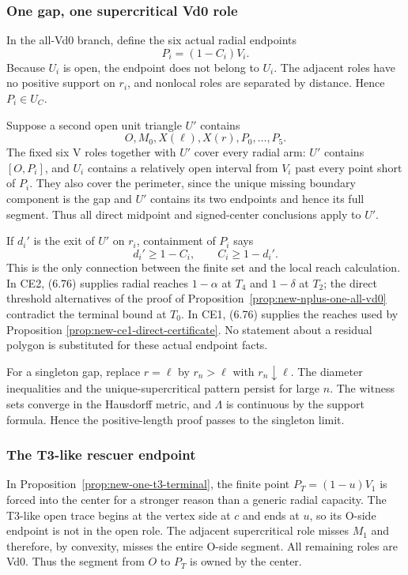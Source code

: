 \subsubsection{One gap, one supercritical Vd0 role}

In the all-Vd0 branch, define the six actual radial endpoints
\[
 P_i=(1-C_i)V_i.
\]
Because $U_i$ is open, the endpoint does not belong to $U_i$.  The adjacent
roles have no positive support on $r_i$, and nonlocal roles are separated by
distance.  Hence $P_i\in U_C$.

Suppose a second open unit triangle $U'$ contains
\[
 O,M_0,X(\ell),X(r),P_0,\ldots,P_5.
\]
The fixed six V roles together with $U'$ cover every radial arm: $U'$ contains
$[O,P_i]$, and $U_i$ contains a relatively open interval from $V_i$ past every
point short of $P_i$.  They also cover the perimeter, since the unique missing
boundary component is the gap and $U'$ contains its two endpoints and hence
its full segment.  Thus all direct midpoint and signed-center conclusions
apply to $U'$.

If $d_i'$ is the exit of $U'$ on $r_i$, containment of $P_i$ says
\[
 d_i'\ge1-C_i,
 \qquad
 C_i\ge1-d_i'.
 \tag{6.76}
\]
This is the only connection between the finite set and the local reach
calculation.  In CE2, (6.76) supplies radial reaches $1-\alpha$ at $T_4$ and
$1-\delta$ at $T_2$; the direct threshold alternatives of the proof of
Proposition~\ref{prop:new-nplus-one-all-vd0} contradict the terminal bound at
$T_0$.  In CE1, (6.76) supplies the reaches used by Proposition
\ref{prop:new-ce1-direct-certificate}.  No statement about a residual polygon
is substituted for these actual endpoint facts.

For a singleton gap, replace $r=\ell$ by $r_n>\ell$ with $r_n\downarrow\ell$.
The diameter inequalities and the unique-supercritical pattern persist for
large $n$.  The witness sets converge in the Hausdorff metric, and
$\Lambda$ is continuous by the support formula.  Hence the positive-length
proof passes to the singleton limit.

\subsubsection{The T3-like rescuer endpoint}

In Proposition~\ref{prop:new-one-t3-terminal}, the finite point
$P_T=(1-u)V_1$ is forced into the center for a stronger reason than a generic
radial capacity.  The T3-like open trace begins at the vertex side at $c$ and
ends at $u$, so its O-side endpoint is not in the open role.  The adjacent
supercritical role misses $M_1$ and therefore, by convexity, misses the entire
O-side segment.  All remaining roles are Vd0.  Thus the segment from $O$ to
$P_T$ is owned by the center.

